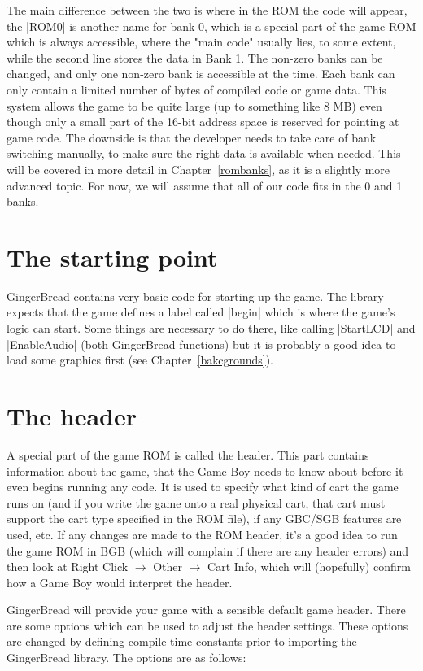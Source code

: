 \documentclass[11pt]{book}
\begin{document}
The main difference between the two is where in the ROM the code will appear, the |ROM0| is another name for bank 0, which is a special part of the game ROM which is always accessible, where the "main code" usually lies, to some extent, while the second line stores the data in Bank 1. The non-zero banks can be changed, and only one non-zero bank is accessible at the time. Each bank can only contain a limited number of bytes of compiled code or game data. This system allows the game to be quite large (up to something like 8 MB) even though only a small part of the 16-bit address space is reserved for pointing at game code. The downside is that the developer needs to take care of bank switching manually, to make sure the right data is available when needed. This will be covered in more detail in Chapter~\ref{rombanks}, as it is a slightly more advanced topic. For now, we will assume that all of our code fits in the 0 and 1 banks.

\section{The starting point}
\label{begin}
GingerBread contains very basic code for starting up the game. The library expects that the game defines a label called |begin| which is where the game's logic can start. Some things are necessary to do there, like calling |StartLCD| and |EnableAudio| (both GingerBread functions) but it is probably a good idea to load some graphics first (see Chapter~\ref{bakcgrounds}).

\section{The header}
\label{header}
A special part of the game ROM is called the header. This part contains information about the game, that the Game Boy needs to know about before it even begins running any code. It is used to specify what kind of cart the game runs on (and if you write the game onto a real physical cart, that cart must support the cart type specified in the ROM file), if any GBC/SGB features are used, etc. If any changes are made to the ROM header, it’s a good idea to run the game ROM in BGB (which will complain if there are any header errors) and then look at Right Click $\rightarrow$ Other $\rightarrow$ Cart Info, which will (hopefully) confirm how a Game Boy would interpret the header. 

GingerBread will provide your game with a sensible default game header. There are some options which can be used to adjust the header settings. These options are changed by defining compile-time constants prior to importing the GingerBread library. The options are as follows:
\end{document}
